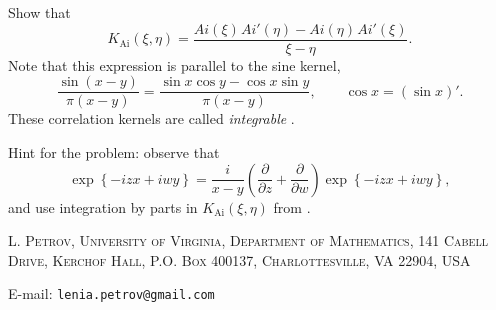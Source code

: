 \documentclass[letterpaper,11pt,oneside,reqno]{article}
\numberwithin{equation}{section}
\newcommand{\ssp}{\hspace{1pt}}
\theoremstyle{definition}
\begin{document}
Show that
\begin{equation*}
	K_{\mathrm{Ai}}(\xi,\eta)=
	\frac{Ai(\xi)\ssp Ai'(\eta)-Ai(\eta)\ssp Ai'(\xi)}{\xi-\eta}.
\end{equation*}
Note that this expression is parallel to the sine kernel,
\begin{equation*}
	\frac{\sin(x-y)}{\pi(x-y)}=\frac{\sin x\cos y-\cos x\sin y}{\pi(x-y)},\qquad 
	\cos x=(\sin x)'.
\end{equation*}
These correlation kernels are called \emph{integrable}
\cite{its1990differential}.

Hint for the problem: observe that 
\begin{equation*}
	\exp\left\{ -i z x+iwy \right\}=\frac{i}{x-y}\left( \frac{\partial}{\partial z}+
	\frac{\partial}{\partial w}\right)\exp\left\{ -i z x+iwy \right\},
\end{equation*}
and use integration by parts in $K_{\mathrm{Ai}}(\xi,\eta)$
from .






\medskip

\textsc{L. Petrov, University of Virginia, Department of Mathematics, 141 Cabell Drive, Kerchof Hall, P.O. Box 400137, Charlottesville, VA 22904, USA}

E-mail: \texttt{lenia.petrov@gmail.com}
\end{document}
